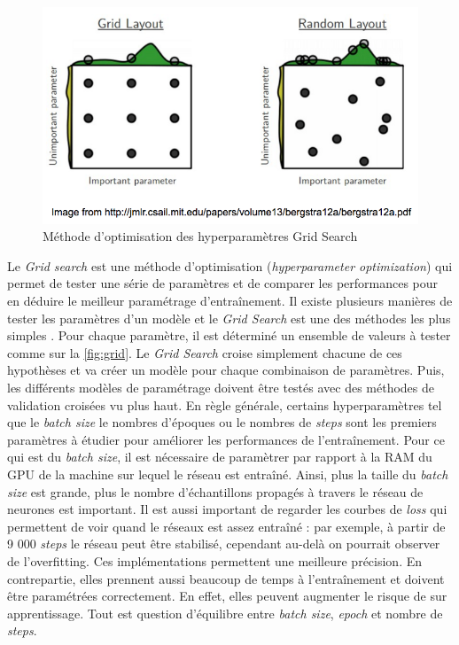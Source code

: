     \begin{figure}[H]
        \centering
        \includegraphics[width=0.6\linewidth]{Rapport/images/grid_search.png}
        \caption{Méthode d'optimisation des hyperparamètres Grid Search}
        \label{fig:grid}
    \end{figure}
Le \textit{Grid search} est une méthode d’optimisation (\textit{hyperparameter optimization}) qui permet de tester une série de paramètres et de comparer les performances pour en déduire le meilleur paramétrage d'entraînement. Il existe plusieurs manières de tester les paramètres d’un modèle et le \textit{Grid Search} est une des méthodes les plus simples \cite{noauthor_32_nodate}. Pour chaque paramètre, il est déterminé un ensemble de valeurs à tester comme sur la \autoref{fig:grid}. Le \textit{Grid Search} croise simplement chacune de ces hypothèses et va créer un modèle pour chaque combinaison de paramètres. Puis, les différents modèles de paramétrage doivent être testés avec des méthodes de validation croisées vu plus haut. 
En règle générale, certains hyperparamètres tel que le \textit{batch size} le nombres d'époques ou le nombres de \textit{steps} sont les premiers paramètres à étudier pour améliorer les performances de l'entraînement. Pour ce qui est du \textit{batch size}, il est nécessaire de paramètrer par rapport à la RAM du GPU de la machine sur lequel le réseau est entraîné. Ainsi, plus la taille du \textit{batch size} est grande, plus le nombre d'échantillons propagés à travers le réseau de neurones est important. Il est aussi important de regarder les courbes de \textit{loss} qui permettent de voir quand le réseaux est assez entraîné : par exemple, à partir de 9 000 \textit{steps} le réseau peut être stabilisé, cependant au-delà on pourrait observer de l'overfitting. Ces implémentations permettent une meilleure précision. En contrepartie, elles prennent aussi beaucoup de temps à l'entraînement et doivent être paramétrées correctement. En effet, elles peuvent augmenter le risque de sur apprentissage. Tout est question d'équilibre entre \textit{batch size}, \textit{epoch} et nombre de \textit{steps}.  

